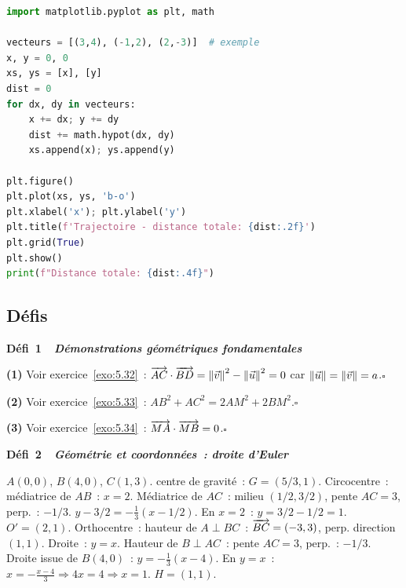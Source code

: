 
\begin{lstlisting}[language=Python]
import matplotlib.pyplot as plt, math

vecteurs = [(3,4), (-1,2), (2,-3)]  # exemple
x, y = 0, 0
xs, ys = [x], [y]
dist = 0
for dx, dy in vecteurs:
    x += dx; y += dy
    dist += math.hypot(dx, dy)
    xs.append(x); ys.append(y)

plt.figure()
plt.plot(xs, ys, 'b-o')
plt.xlabel('x'); plt.ylabel('y')
plt.title(f'Trajectoire - distance totale: {dist:.2f}')
plt.grid(True)
plt.show()
print(f"Distance totale: {dist:.4f}")
\end{lstlisting}

\subsection*{D\'efis}

\noindent{}
{\color{BO}\bfseries\small D\'efi~1~\textendash\ \textit{D\'emonstrations g\'eom\'etriques fondamentales}}
\par\smallskip

\textbf{(1)} Voir exercice~\ref{exo:5.32}~: $\overrightarrow{AC}\cdot\overrightarrow{BD}=\left\|\vec{v}\right\|^2-\left\|\vec{u}\right\|^2=0$ car $\left\|\vec{u}\right\|=\left\|\vec{v}\right\|=a$.\hfill$\square$

\textbf{(2)} Voir exercice~\ref{exo:5.33}~: $AB^2+AC^2=2AM^2+2BM^2$.\hfill$\square$

\textbf{(3)} Voir exercice~\ref{exo:5.34}~: $\overrightarrow{MA}\cdot\overrightarrow{MB}=0$.\hfill$\square$

\noindent{}
{\color{BO}\bfseries\small D\'efi~2~\textendash\ \textit{G\'eom\'etrie et coordonn\'ees~: droite d'Euler}}
\par\smallskip

$A(0,0)$, $B(4,0)$, $C(1,3)$.
centre de gravité~: $G=(5/3,1)$.
Circocentre~: m\'ediatrice de $AB$~: $x=2$.
M\'ediatrice de $AC$~: milieu $(1/2,3/2)$, pente $AC=3$, perp.~: $-1/3$.
$y-3/2=-\frac{1}{3}(x-1/2)$. En $x=2$~: $y=3/2-1/2=1$. $O'=(2,1)$.
Orthocentre~: hauteur de $A\perp BC$~: $\overrightarrow{BC}=(-3,3)$, perp. direction $(1,1)$.
Droite~: $y=x$. Hauteur de $B\perp AC$~: pente $AC=3$, perp.~: $-1/3$.
Droite issue de $B(4,0)$~: $y=-\frac{1}{3}(x-4)$. En $y=x$~: $x=-\frac{x-4}{3}\Rightarrow4x=4\Rightarrow x=1$.
$H=(1,1)$.

